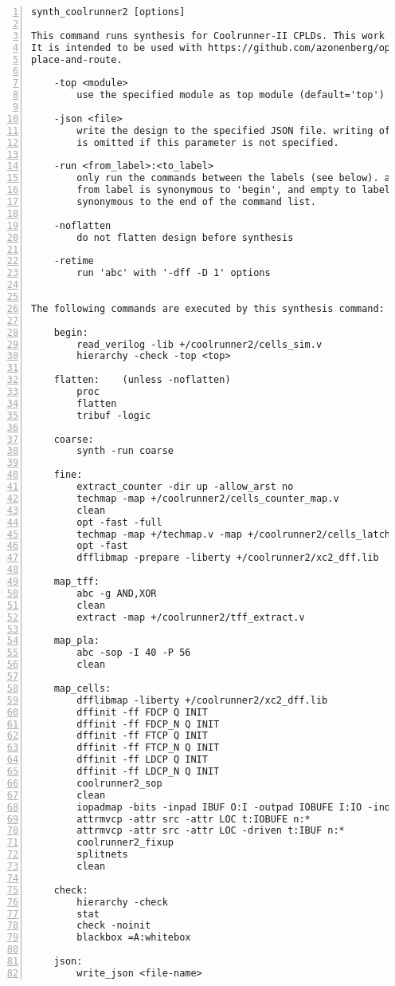\begin{lstlisting}[numbers=left,frame=single]
    synth_coolrunner2 [options]

This command runs synthesis for Coolrunner-II CPLDs. This work is experimental.
It is intended to be used with https://github.com/azonenberg/openfpga as the
place-and-route.

    -top <module>
        use the specified module as top module (default='top')

    -json <file>
        write the design to the specified JSON file. writing of an output file
        is omitted if this parameter is not specified.

    -run <from_label>:<to_label>
        only run the commands between the labels (see below). an empty
        from label is synonymous to 'begin', and empty to label is
        synonymous to the end of the command list.

    -noflatten
        do not flatten design before synthesis

    -retime
        run 'abc' with '-dff -D 1' options


The following commands are executed by this synthesis command:

    begin:
        read_verilog -lib +/coolrunner2/cells_sim.v
        hierarchy -check -top <top>

    flatten:    (unless -noflatten)
        proc
        flatten
        tribuf -logic

    coarse:
        synth -run coarse

    fine:
        extract_counter -dir up -allow_arst no
        techmap -map +/coolrunner2/cells_counter_map.v
        clean
        opt -fast -full
        techmap -map +/techmap.v -map +/coolrunner2/cells_latch.v
        opt -fast
        dfflibmap -prepare -liberty +/coolrunner2/xc2_dff.lib

    map_tff:
        abc -g AND,XOR
        clean
        extract -map +/coolrunner2/tff_extract.v

    map_pla:
        abc -sop -I 40 -P 56
        clean

    map_cells:
        dfflibmap -liberty +/coolrunner2/xc2_dff.lib
        dffinit -ff FDCP Q INIT
        dffinit -ff FDCP_N Q INIT
        dffinit -ff FTCP Q INIT
        dffinit -ff FTCP_N Q INIT
        dffinit -ff LDCP Q INIT
        dffinit -ff LDCP_N Q INIT
        coolrunner2_sop
        clean
        iopadmap -bits -inpad IBUF O:I -outpad IOBUFE I:IO -inoutpad IOBUFE O:IO -toutpad IOBUFE E:I:IO -tinoutpad IOBUFE E:O:I:IO
        attrmvcp -attr src -attr LOC t:IOBUFE n:*
        attrmvcp -attr src -attr LOC -driven t:IBUF n:*
        coolrunner2_fixup
        splitnets
        clean

    check:
        hierarchy -check
        stat
        check -noinit
        blackbox =A:whitebox

    json:
        write_json <file-name>
\end{lstlisting}

